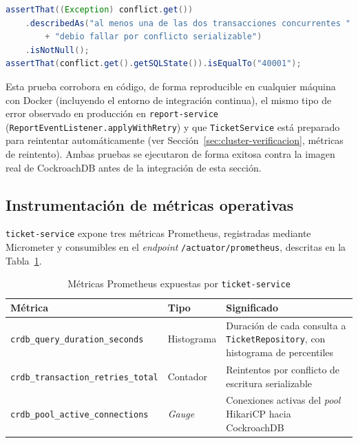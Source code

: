 \documentclass[11pt,letterpaper]{article}
\begin{document}
\begin{lstlisting}[language=Java, caption={Extracto de la prueba de conflicto serializable}, label={lst:testcontainers}]
assertThat((Exception) conflict.get())
    .describedAs("al menos una de las dos transacciones concurrentes "
        + "debio fallar por conflicto serializable")
    .isNotNull();
assertThat(conflict.get().getSQLState()).isEqualTo("40001");
\end{lstlisting}

Esta prueba corrobora en código, de forma reproducible en cualquier máquina con Docker
(incluyendo el entorno de integración continua), el mismo tipo de error observado en producción
en \texttt{report-service} (\texttt{ReportEventListener.applyWithRetry}) y que
\texttt{TicketService} está preparado para reintentar automáticamente (ver
Sección~\ref{sec:cluster-verificacion}, métricas de reintento). Ambas pruebas se ejecutaron de
forma exitosa contra la imagen real de CockroachDB antes de la integración de esta sección.

\subsection{Instrumentación de métricas operativas}

\texttt{ticket-service} expone tres métricas Prometheus, registradas mediante Micrometer y
consumibles en el \emph{endpoint} \texttt{/actuator/prometheus}, descritas en la
Tabla~\ref{tab:metricas}.

\begin{table}[H]
\centering
\caption{Métricas Prometheus expuestas por \texttt{ticket-service}}
\label{tab:metricas}
\begin{tabular}{@{}p{4.3cm}p{1.8cm}p{6.7cm}@{}}
\toprule
\textbf{Métrica} & \textbf{Tipo} & \textbf{Significado} \\
\midrule
\texttt{crdb\_query\_duration\_seconds} & Histograma & Duración de cada consulta a \texttt{TicketRepository}, con histograma de percentiles \\
\texttt{crdb\_transaction\_retries\_total} & Contador & Reintentos por conflicto de escritura serializable \\
\texttt{crdb\_pool\_active\_connections} & \emph{Gauge} & Conexiones activas del \emph{pool} HikariCP hacia CockroachDB \\
\bottomrule
\end{tabular}
\end{table}
\end{document}
